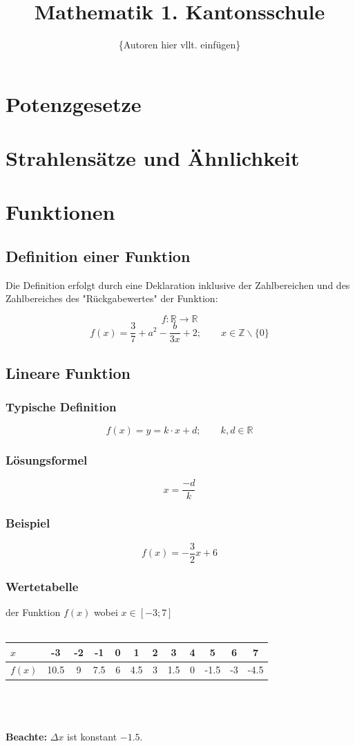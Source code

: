 \documentclass[12pt,a4paper]{scrbook}
\author{\{Autoren hier vllt. einfügen\}}
\title{Mathematik 1. Kantonsschule}
\begin{document}

\maketitle
\tableofcontents

\newpage

\chapter{Potenzgesetze}


\chapter{Strahlensätze und Ähnlichkeit}


\chapter{Funktionen}
\section{Definition einer Funktion}
Die Definition erfolgt durch eine Deklaration inklusive
der Zahlbereichen und des Zahlbereiches des "Rückgabewertes" der Funktion:

\[ f : \mathbb{R} \rightarrow \mathbb{R}\]
\[ f(x) = \frac{3}{7} + a^2 - \frac{b}{3x} + 2; \quad\quad x \in \mathbb{Z}\backslash\{0\}\]

\section{Lineare Funktion}
\subsection{Typische Definition}
\[f(x) = y = k \cdot x + d; \quad\quad k, d \in \mathbb{R}\]
\subsection{Lösungsformel}
\[x = \frac{-d}{k}\]

\subsection{Beispiel}
\[f(x) = -\frac{3}{2}x + 6\]

\subsection{Wertetabelle} der Funktion $f(x)$ wobei $x \in [-3; 7]$\\\\
\begin{tabular}{l||c|c|c|c|c|c|c|c|c|c|c}
$x$ & -3 & -2 & -1 & 0 & 1 & 2 & 3 & 4 & 5 & 6 & 7\\
\hline
$f(x)$ & 10.5 & 9 & 7.5 & 6 & 4.5 & 3 & 1.5 & 0 & -1.5 & -3 & -4.5\\
\end{tabular}\\\\\\
\textbf{Beachte:} $\Delta x$ ist konstant $-1.5$.\\
\end{document}
